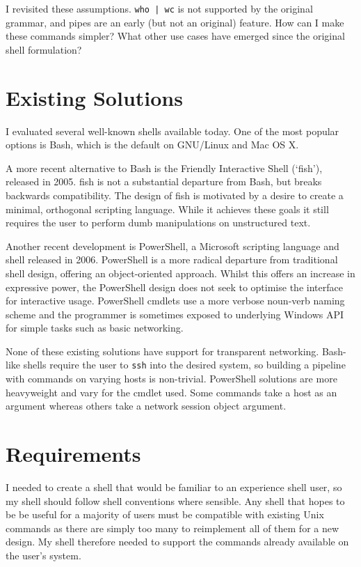 \documentclass[12pt,twoside,notitlepage]{report}
\begin{document}
I revisited these assumptions. \texttt{who | wc} is not supported by the
original grammar, and pipes are an early (but not an original) feature. How can
I make these commands simpler? What other use cases have emerged since the
original shell formulation?

\section{Existing Solutions}
I evaluated several well-known shells available today. One of the most popular
options is Bash, which is the default on GNU/Linux and Mac OS X.

A more recent alternative to Bash is the Friendly Interactive Shell (`fish'),
released in 2005. fish is not a substantial departure from Bash, but breaks
backwards compatibility. The design of fish\cite{fishdesign} is motivated by a
desire to create a minimal, orthogonal scripting language. While it achieves
these goals it still requires the user to perform dumb manipulations on
unstructured text.

Another recent development is PowerShell, a Microsoft scripting language and
shell released in 2006. PowerShell is a more radical departure from traditional
shell design, offering an object-oriented approach. Whilst this offers an
increase in expressive power, the PowerShell design does not seek to optimise
the interface for interactive usage. PowerShell cmdlets use a more verbose
noun-verb naming scheme and the programmer is sometimes exposed to underlying
Windows API for simple tasks such as basic networking.

None of these existing solutions have support for transparent
networking. Bash-like shells require the user to {\tt ssh} into the desired
system, so building a pipeline with commands on varying hosts is
non-trivial. PowerShell solutions are more heavyweight and vary for the cmdlet
used. Some commands take a host as an argument whereas others take a network
session object argument.

\section{Requirements}
I needed to create a shell that would be familiar to an experience shell user,
so my shell should follow shell conventions where sensible. Any shell that hopes
to be be useful for a majority of users must be compatible with existing Unix
commands as there are simply too many to reimplement all of them for a new
design. My shell therefore needed to support the commands already available on
the user's system.
\end{document}
